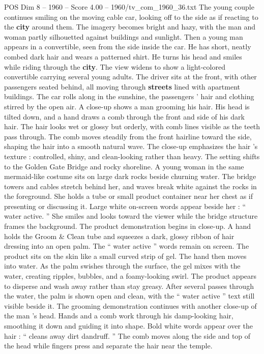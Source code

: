 \begin{textsample}{POS Dim 8 – 1960 – Score 4.00 – 1960/tv\_com\_1960\_36.txt}
The young couple continues smiling on the moving cable car, looking off to the side as if reacting to the \textbf{city} around them.
The imagery becomes bright and hazy, with the man and woman partly silhouetted against buildings and sunlight.
Then a young man appears in a convertible, seen from the side inside the car.
He has short, neatly combed dark hair and wears a patterned shirt.
He turns his head and smiles while riding through the \textbf{city}.
The view widens to show a light-colored convertible carrying several young adults.
The driver sits at the front, with other passengers seated behind, all moving through \textbf{streets} lined with apartment buildings.
The car rolls along in the sunshine, the passengers ’ hair and clothing stirred by the open air.
A close-up shows a man grooming his hair.
His head is tilted down, and a hand draws a comb through the front and side of his dark hair.
The hair looks wet or glossy but orderly, with comb lines visible as the teeth pass through.
The comb moves steadily from the front hairline toward the side, shaping the hair into a smooth natural wave.
The close-up emphasizes the hair ’s texture : controlled, shiny, and clean-looking rather than heavy.
The setting shifts to the Golden Gate Bridge and rocky shoreline.
A young woman in the same mermaid-like costume sits on large dark rocks beside churning water.
The bridge towers and cables stretch behind her, and waves break white against the rocks in the foreground.
She holds a tube or small product container near her chest as if presenting or discussing it.
Large white on-screen words appear beside her : “ water active. ” She smiles and looks toward the viewer while the bridge structure frames the background.
The product demonstration begins in close-up.
A hand holds the Groom \& Clean tube and squeezes a dark, glossy ribbon of hair dressing into an open palm.
The “ water active ” words remain on screen.
The product sits on the skin like a small curved strip of gel.
The hand then moves into water.
As the palm swishes through the surface, the gel mixes with the water, creating ripples, bubbles, and a foamy-looking swirl.
The product appears to disperse and wash away rather than stay greasy.
After several passes through the water, the palm is shown open and clean, with the “ water active ” text still visible beside it.
The grooming demonstration continues with another close-up of the man ’s head.
Hands and a comb work through his damp-looking hair, smoothing it down and guiding it into shape.
Bold white words appear over the hair : “ cleans away dirt dandruff. ” The comb moves along the side and top of the head while fingers press and separate the hair near the temple.

\end{textsample}
